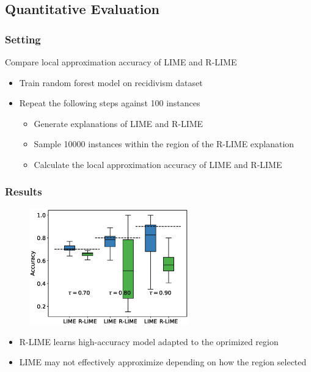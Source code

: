 \documentclass[aspectratio=169]{slide-en}
\begin{document}
\subsection{Quantitative Evaluation}

\subsubsection{Setting}

\begin{frame}{}
  Compare local approximation accuracy of LIME and R-LIME
  \begin{itemize}
    \item Train random forest model on recidivism dataset
    \item Repeat the following steps against 100 instances
          \begin{itemize}
            \item Generate explanations of LIME and R-LIME
            \item Sample 10000 instances within the region of
                  the R-LIME explanation
            \item Calculate the local approximation accuracy of LIME and R-LIME
          \end{itemize}
  \end{itemize}
\end{frame}

\subsubsection{Results}
\begin{frame}{}
  \begin{figure}
    \includegraphics[height=142pt]{box_plot}
  \end{figure}
  \begin{itemize}
    \item R-LIME learns high-accuracy model adapted to the oprimized region
    \item LIME may not effectively approximize depending on how the region selected
  \end{itemize}
\end{frame}
\end{document}
